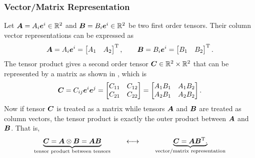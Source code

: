 \subsubsection{Vector/Matrix Representation}
Let $\bm{A}=A_i\bm{e}^i\in\mathbb{R}^2$ and $\bm{B}=B_i\bm{e}^i\in\mathbb{R}^2$ be two first order tensors. Their column vector representations can be expressed as
\begin{gather}
\bm{A}=A_i\bm{e}^i=\begin{bmatrix}
A_1&A_2
\end{bmatrix}^{\mathrm{T}},\qquad
\bm{B}=B_i\bm{e}^i=\begin{bmatrix}
B_1&B_2
\end{bmatrix}^{\mathrm{T}}.
\end{gather}
The tensor product  gives a second order tensor $\bm{C}\in\mathbb{R}^2\times\mathbb{R}^2$ that can be represented by a matrix as shown in , which is
\begin{gather}
\bm{C}=C_{ij}\bm{e}^i\bm{e}^j=\begin{bmatrix}
C_{11}&C_{12}\\
C_{21}&C_{22}
\end{bmatrix}=\begin{bmatrix}
A_1B_1&A_1B_2\\
A_2B_1&A_2B_2
\end{bmatrix}.
\end{gather}
Now if tensor $\bm{C}$ is treated as a matrix while tensors $\bm{A}$ and $\bm{B}$ are treated as column vectors, the tensor product is exactly the outer product between $\bm{A}$ and $\bm{B}$. That is,
\begin{gather}\label{eq:tensor_product}
\underbrace{\bm{C}=\bm{A}\otimes\bm{B}=\bm{A}\bm{B}}_\text{tensor product between tensors}\qquad\longleftrightarrow\qquad\underbrace{\bm{C}=\bm{A}\bm{B}^{\mathrm{T}}.}_\text{{vector/matrix representation}}
\end{gather}

